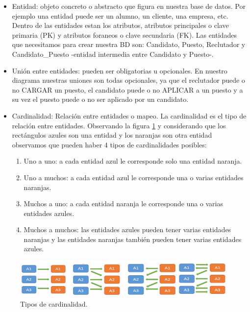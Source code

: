 \documentclass[12pt,a4paper]{article}
\begin{document}
\begin{itemize}
\item Entidad: objeto concreto o abstracto que figura en nuestra base de datos. Por ejemplo una entidad puede ser un alumno, un cliente, una empresa, etc. Dentro de las entidades estan los atributos, atributos principales o clave primaria (PK) y atributos foraneos o clave secundaria (FK).  Las entidades que necesitamos para crear nuestra BD son: Candidato, Puesto, Reclutador y Candidato\_Puesto -entidad intermedia entre Candidato y Puesto-.
\item Unión entre entidades: pueden ser obligatorias u opcionales. En nuestro diagrama nuestras uniones son todas opcionales, ya que el reclutador puede o no CARGAR un puesto, el candidato puede o no APLICAR a un puesto y a su vez el puesto puede o no ser aplicado por un candidato. 
\item Cardinalidad: Relación entre entidades o mapeo. La cardinalidad es el tipo de relación entre entidades. Observando la figura \ref{fig:Cardinalidad} y considerando que los rectángulos azules son una entidad y los naranjas son otra entidad observamos que pueden haber 4 tipos de cardinalidades posibles:

\begin{enumerate}
\item Uno a uno: a cada entidad azul le corresponde solo una entidad naranja.
\item Uno a muchos: a cada entidad azul le corresponde una o varias entidades naranjas.
\item Muchos a uno: a cada entidad naranja le corresponde una o varias entidades azules.
\item Muchos a muchos: las entidades azules pueden tener varias entidades naranjas y las entidades naranjas también pueden tener varias entidades azules.
\end{enumerate}
\end{itemize}

\begin{figure}[H]    %
  \centering
  \includegraphics[width=1\textwidth]{images/Cardinalidad.png}
  \caption{Tipos de cardinalidad.}  
  \label{fig:Cardinalidad}
\end{figure}
\end{document}
